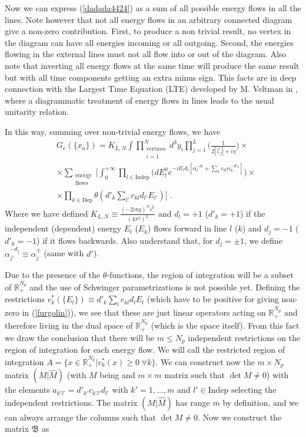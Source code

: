 \documentclass[%
 reprint,
 amsmath,amssymb,
 aps,
]{revtex4-1}
\begin{document}
Now we can express (\ref{dadada4424}) as a sum of all possible energy flows in all the lines. Note however that not all energy flows in an arbitrary connected diagram give a non-zero contribution. First, to produce a non trivial result, no vertex in the diagram can have all energies incoming or all outgoing. Second, the energies flowing in the external lines must not all flow into or out of the diagram. Also note that inverting all energy flows at the same time will produce the same result but with all time components getting an extra minus sign. This facts are in deep connection with the Largest Time Equation (LTE) developed by M. Veltman in \cite{Veltman2}, where a diagrammatic treatment of energy flows in lines leads to the usual unitarity relation.\par
 In this way, summing over non-trivial energy flows, we have 
  \begin{align}
&G_e(\{x_a\})\nonumber=K_{L,N}\int\prod_{\substack{\text{vertices}\\i=1}}^Nd^3y_i\prod_{j=1}^L\Big(\frac{1}{2|\vec{z}_j|+i\eta}\Big)\times\\
&\times\sum_{\substack{\text{energy}\\\text{flows}}}\Big[\int_{0}^{+\infty}\prod_{l\in \text{Indep}}\Big({dE^0_l}e^{-i E_ld_l[\alpha^{-d_l}_l+\sum_k c_{kl}\alpha_k^{-d'_k}]}\Big)\nonumber\times\\
&\times\prod_{k\in \text{Dep}}\theta({d'}_k\sum_{l'}c_{kl}d_{l'}E_{l'})\label{furgolin}\Big]\;.
\end{align}
Where we have defined $K_{L,N}\equiv\frac{(-2i\pi g)^Ni^L}{(4\pi^2)^L}$ and $d_l=+1$ (${d'}_k=+1$) if the independent (dependent) energy $E_l$ ($E_k$) flows forward in line $l$ ($k$) and $d_j=-1$ (${d'}_k=-1$) if it flows backwards. Also understand that, for $d_j=\pm1$, we define $\alpha_{j'}^{-d_j}\equiv \alpha_j^{\mp}$ (same with $d'$). \par
Due to the presence of the $\theta$-functions, the region of integration will be a subset of $\mathbb{R}_+^{N_p}$ and the use of Schwinger parametrizations is not possible yet. Defining the restrictions $v_k^*(\{E_l\})\equiv d'_k\sum_l c_{kl}d_lE_l$ (which have to be positive for giving non-zero in (\ref{furgolin})), we see that these are just linear operators acting on $\mathbb{R}_+^{N_p}$ and therefore living in the dual space of $\mathbb{R}_+^{N_p}$ (which is the space itself). From this fact we draw the conclusion that there will be $m\leq N_p$ independent restrictions on the region of integration for each energy flow. We will call the restricted region of integration  $A=\{x\in\mathbb{R}_+^{N_p}|v^*_k(x)\geq0\;\forall k\}$.  We can construct now the $m\times N_p$ matrix $(M|\hat{M})$ (with $M$ being and $m\times m$ matrix such that $\det M\neq0$) with the elements $a_{{k'}l'}=d'_{k'}c_{k'l'}d_{l'}$ with $k'=1,...,m$ and $l'\in\text{Indep}$ selecting the independent restrictions. The matrix $(M|\hat{M})$ has range $m$ by definition, and we can always arrange the columns such that $\det{M}\neq0$. Now we construct the matrix $\mathfrak{B}$ as
\end{document}
